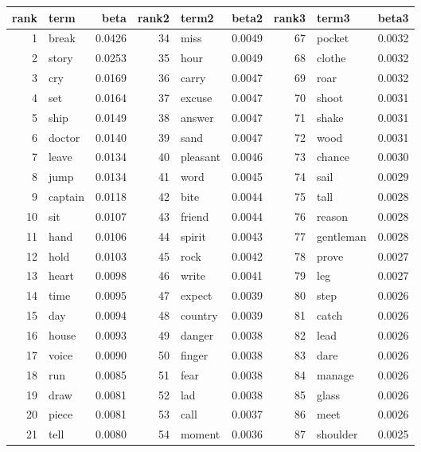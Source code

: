 \begin{table}[ht]
\centering
\begin{tabular}{rlrrlrrlr}
  \hline
rank & term & beta & rank2 & term2 & beta2 & rank3 & term3 & beta3 \\ 
  \hline
1 & break & 0.0426 & 34 & miss & 0.0049 & 67 & pocket & 0.0032 \\ 
  2 & story & 0.0253 & 35 & hour & 0.0049 & 68 & clothe & 0.0032 \\ 
  3 & cry & 0.0169 & 36 & carry & 0.0047 & 69 & roar & 0.0032 \\ 
  4 & set & 0.0164 & 37 & excuse & 0.0047 & 70 & shoot & 0.0031 \\ 
  5 & ship & 0.0149 & 38 & answer & 0.0047 & 71 & shake & 0.0031 \\ 
  6 & doctor & 0.0140 & 39 & sand & 0.0047 & 72 & wood & 0.0031 \\ 
  7 & leave & 0.0134 & 40 & pleasant & 0.0046 & 73 & chance & 0.0030 \\ 
  8 & jump & 0.0134 & 41 & word & 0.0045 & 74 & sail & 0.0029 \\ 
  9 & captain & 0.0118 & 42 & bite & 0.0044 & 75 & tall & 0.0028 \\ 
  10 & sit & 0.0107 & 43 & friend & 0.0044 & 76 & reason & 0.0028 \\ 
  11 & hand & 0.0106 & 44 & spirit & 0.0043 & 77 & gentleman & 0.0028 \\ 
  12 & hold & 0.0103 & 45 & rock & 0.0042 & 78 & prove & 0.0027 \\ 
  13 & heart & 0.0098 & 46 & write & 0.0041 & 79 & leg & 0.0027 \\ 
  14 & time & 0.0095 & 47 & expect & 0.0039 & 80 & step & 0.0026 \\ 
  15 & day & 0.0094 & 48 & country & 0.0039 & 81 & catch & 0.0026 \\ 
  16 & house & 0.0093 & 49 & danger & 0.0038 & 82 & lead & 0.0026 \\ 
  17 & voice & 0.0090 & 50 & finger & 0.0038 & 83 & dare & 0.0026 \\ 
  18 & run & 0.0085 & 51 & fear & 0.0038 & 84 & manage & 0.0026 \\ 
  19 & draw & 0.0081 & 52 & lad & 0.0038 & 85 & glass & 0.0026 \\ 
  20 & piece & 0.0081 & 53 & call & 0.0037 & 86 & meet & 0.0026 \\ 
  21 & tell & 0.0080 & 54 & moment & 0.0036 & 87 & shoulder & 0.0025 \\ 

\end{tabular}
\end{table}
